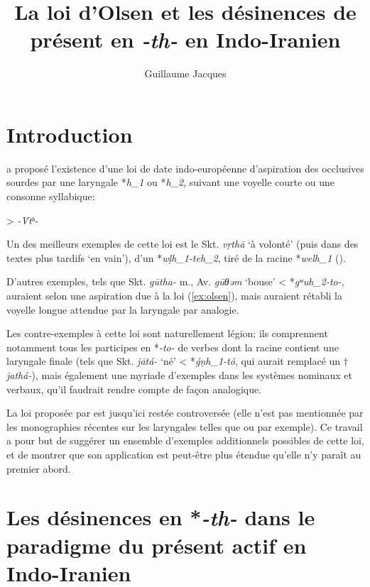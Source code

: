 \documentclass[oldfontcommands,oneside,a4paper,11pt]{article}
\newcommand{\ipa}[1]{{\phon\textit{#1}}} %
\newcommand{\refb}[1]{(\ref{#1})}
\begin{document}
 
\title{La loi d'Olsen et les désinences de présent en \ipa{-th-} en Indo-Iranien}
\author{Guillaume Jacques}
 \maketitle
 
 \section*{Introduction}
\citet{olsen94laryngeal, olsen14stative} a proposé l'existence d'une loi de date indo-européenne d'aspiration des occlusives sourdes par une laryngale *\ipa{h_1} ou *\ipa{h_2}, suivant une voyelle courte ou une consonne syllabique:

\begin{exe}
\ex \label{ex:olsen}
\glt *\ipa{-V̆h_{1/2}T-} > \ipa{-V̆tʰ-}
\end{exe}

Un des meilleurs exemples de cette loi est le Skt. \ipa{vṛthā} `à volonté' (puis dans des textes plus tardifs `en vain'), d'un *\ipa{wḷh_1-teh_2}, tiré de la racine *\ipa{welh_1} (\citealt[677-8]{liv}). 

D'autres exemples, tels que Skt. \ipa{gūtha-} m., Av. \ipa{gūθəm} `bouse' < *\ipa{gʷuh_2-to-}, auraient selon \citet{olsen94laryngeal}  une aspiration due à la loi \refb{ex:olsen}, mais auraient rétabli la voyelle longue attendue par la laryngale par analogie.

Les contre-exemples à cette loi sont naturellement légion; ils comprennent notamment tous les participes en *\ipa{-to-} de verbes dont la racine contient une laryngale finale (tels que Skt. \ipa{jātá-} `né'  < *\ipa{ǵṇh_1-tó}, qui  aurait remplacé un $\dagger$\ipa{jathá-}), mais également une myriade d'exemples dans les systèmes nominaux et verbaux, qu'il faudrait rendre compte de façon analogique.

La loi proposée par \citet{olsen94laryngeal} est jusqu'ici restée controversée (elle n'est pas mentionnée par les monographies récentes sur les laryngales telles que \citealt{mayrhofer05fortsetzung} ou \citealt{zair12celtic} par exemple). Ce travail a pour but de suggérer un ensemble d'exemples additionnels possibles de cette loi, et de montrer que son application est peut-être plus étendue qu'elle n'y paraît au premier abord.

 \section{Les désinences en *\ipa{-th-} dans le paradigme du présent actif en Indo-Iranien}
\end{document}
